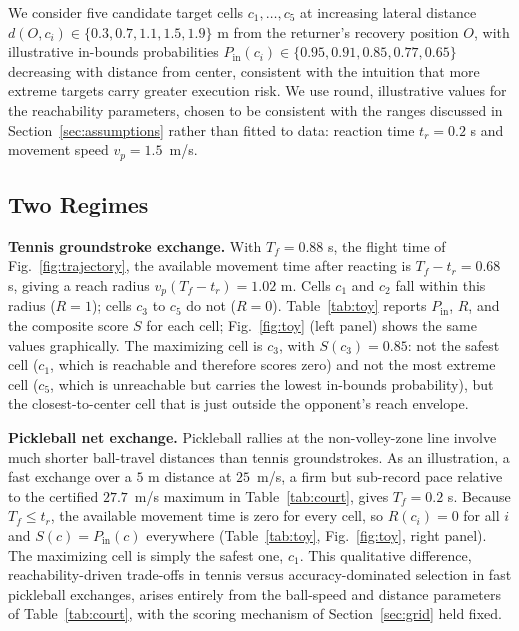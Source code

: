   We consider five candidate target cells $c_1, \dots, c_5$ at increasing
  lateral distance $d(O, c_i) \in \{0.3,\allowbreak 0.7,\allowbreak 1.1,\allowbreak 1.5,\allowbreak 1.9\}$ m from the
  returner's recovery position $O$, with illustrative in-bounds probabilities
  $P_{\mathrm{in}}(c_i) \in \{0.95,\allowbreak 0.91,\allowbreak 0.85,\allowbreak 0.77,\allowbreak 0.65\}$ decreasing with
  distance from center, consistent with the intuition that more extreme targets
  carry greater execution risk. We use round, illustrative values for the
  reachability parameters, chosen to be consistent with the ranges discussed in
  Section~\ref{sec:assumptions} rather than fitted to data: reaction time $t_r
  = 0.2$ s and movement speed $v_p = 1.5$~m/s.

  \subsection{Two Regimes}\label{sec:regimes}

  \textbf{Tennis groundstroke exchange.} With $T_f = 0.88$ s, the flight time of
  Fig.~\ref{fig:trajectory}, the available movement time after reacting is $T_f
  - t_r = 0.68$ s, giving a reach radius $v_p (T_f - t_r) = 1.02$ m. Cells $c_1$
  and $c_2$ fall within this radius ($R = 1$); cells $c_3$ to $c_5$ do not ($R =
  0$). Table~\ref{tab:toy} reports $P_{\mathrm{in}}$, $R$, and the composite
  score $S$ for each cell; Fig.~\ref{fig:toy} (left panel) shows the same values
  graphically. The maximizing cell is $c_3$, with $S(c_3) = 0.85$: not the
  safest cell ($c_1$, which is reachable and therefore scores zero) and not the
  most extreme cell ($c_5$, which is unreachable but carries the lowest
  in-bounds probability), but the closest-to-center cell that is just outside
  the opponent's reach envelope.

  \textbf{Pickleball net exchange.} Pickleball rallies at the non-volley-zone
  line involve much shorter ball-travel distances than tennis groundstrokes. As
  an illustration, a fast exchange over a $5$ m distance at $25$~m/s, a firm but
  sub-record pace relative to the certified $27.7$~m/s maximum in
  Table~\ref{tab:court}, gives $T_f = 0.2$ s. Because $T_f \le t_r$, the
  available movement time is zero for every cell, so $R(c_i) = 0$ for all $i$
  and $S(c) = P_{\mathrm{in}}(c)$ everywhere (Table~\ref{tab:toy},
  Fig.~\ref{fig:toy}, right panel). The maximizing cell is simply the safest
  one, $c_1$. This qualitative difference, reachability-driven trade-offs in
  tennis versus accuracy-dominated selection in fast pickleball exchanges,
  arises entirely from the ball-speed and distance parameters of
  Table~\ref{tab:court}, with the scoring mechanism of Section~\ref{sec:grid}
  held fixed.

